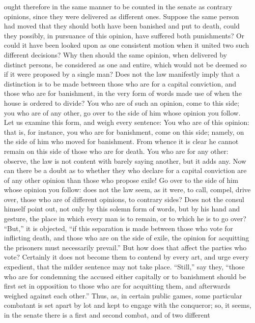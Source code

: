 ought therefore in the same manner to be counted in the senate as contrary
opinions, since they were delivered as different ones. Suppose the same
person had moved that they should both have been banished and put to
death, could they possibly, in pursuance of this opinion, have suffered
both punishments? Or could it have been looked upon as one consistent
motion when it united two such different decisions? Why then should the
same opinion, when delivered by distinct persons, be considered as one and
entire, which would not be deemed so if it were proposed by a single man?
Does not the law manifestly imply that a distinction is to be made between
those who are for a capital conviction, and those who are for banishment,
in the very form of words made use of when the house is ordered to divide?
You who are of such an opinion, come to this side; you who are of any
other, go over to the side of him whose opinion you follow. Let us examine
this form, and weigh every sentence: You who are of this opinion: that is,
for instance, you who are for banishment, come on this side; namely, on
the side of him who moved for banishment. From whence it is clear he
cannot remain on this side of those who are for death. You who are for any
other: observe, the law is not content with barely saying another, but it
adds any. Now can there be a doubt as to whether they who declare for a
capital conviction are of any other opinion than those who propose exile!
Go over to the side of him whose opinion you follow: does not the law
seem, as it were, to call, compel, drive over, those who are of different
opinions, to contrary sides? Does not the consul himself point out, not
only by this solemn form of words, but by his hand and gesture, the place
in which every man is to remain, or to which he is to go over? ``But,'' it
is objected, ``if this separation is made between those who vote for
inflicting death, and those who are on the side of exile, the opinion for
acquitting the prisoners must necessarily prevail.'' But how does that
affect the parties who vote? Certainly it does not become them to contend
by every art, and urge every expedient, that the milder sentence may not
take place. ``Still,'' say they, ``those who are for condemning the accused
either capitally or to banishment should be first set in opposition to
those who are for acquitting them, and afterwards weighed against each
other.'' Thus, as, in certain public games, some particular combatant is
set apart by lot and kept to engage with the conqueror; so, it seems, in
the senate there is a first and second combat, and of two different
